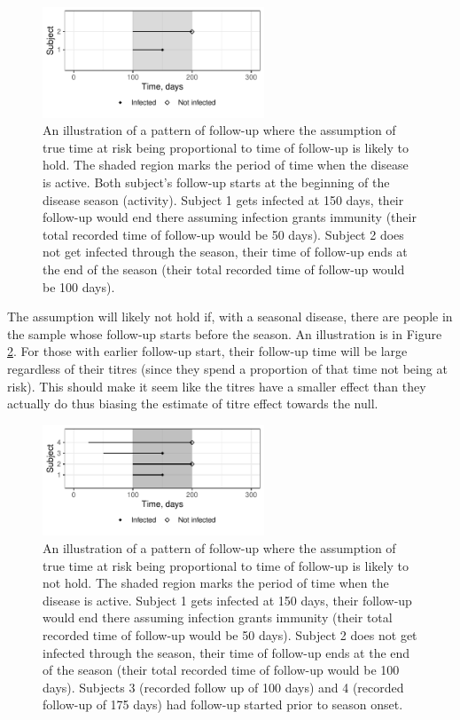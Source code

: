 \documentclass[12pt]{article}
\begin{document}
\begin{figure}[htp]
	\centering
	\includegraphics[width=0.59\textwidth]{../curve-cox/timeplot_3_light.pdf}
	\caption{
	An illustration of a pattern of follow-up where the assumption of true time at risk being proportional to time of follow-up is likely to hold. The shaded region marks the period of time when the disease is active. Both subject's follow-up starts at the beginning of the disease season (activity). Subject 1 gets infected at 150 days, their follow-up would end there assuming infection grants immunity (their total recorded time of follow-up would be 50 days). Subject 2 does not get infected through the season, their time of follow-up ends at the end of the season (their total recorded time of follow-up would be 100 days).
	}
	\label{CoxIdeal}
\end{figure}

\pagebreak

The assumption will likely not hold if, with a seasonal disease, there are people in the sample whose follow-up starts before the season. An illustration is in Figure \ref{CoxNotIdeal}. For those with earlier follow-up start, their follow-up time will be large regardless of their titres (since they spend a proportion of that time not being at risk). This should make it seem like the titres have a smaller effect than they actually do thus biasing the estimate of titre effect towards the null.

\begin{figure}[htp]
	\centering
	\includegraphics[width=0.59\textwidth]{../curve-cox/timeplot_4_light.pdf}
	\caption{
	An illustration of a pattern of follow-up where the assumption of true time at risk being proportional to time of follow-up is likely to not hold. The shaded region marks the period of time when the disease is active. Subject 1 gets infected at 150 days, their follow-up would end there assuming infection grants immunity (their total recorded time of follow-up would be 50 days). Subject 2 does not get infected through the season, their time of follow-up ends at the end of the season (their total recorded time of follow-up would be 100 days). Subjects 3 (recorded follow up of 100 days) and 4 (recorded follow-up of 175 days) had follow-up started prior to season onset.
	}
	\label{CoxNotIdeal}
\end{figure}
\end{document}
